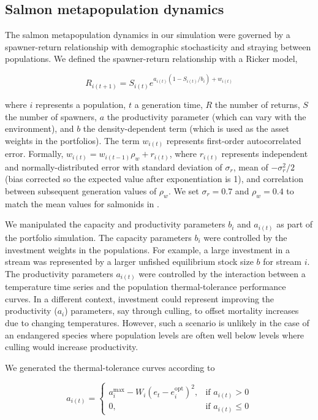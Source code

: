 \documentclass[12pt,english]{article}
\begin{document}
\begin{spacing}{1.3}
\subsection{Salmon metapopulation dynamics}\label{salmon-metapopulation-dynamics}

The salmon metapopulation dynamics in our simulation were governed by a spawner-return relationship with demographic stochasticity and straying between populations. We defined the spawner-return relationship with a Ricker model,

\[R_{i(t+1)} = S_{i(t)}e^{a_{i(t)}(1-S_{i(t)}/b_i) + w_{i(t)}}\]

\noindent
where $i$ represents a population, $t$ a generation time, $R$ the number of returns, $S$ the number of spawners, $a$ the productivity parameter (which can vary with the environment), and $b$ the density-dependent term (which is used as the asset weights in the portfolios). The term $w_{i(t)}$ represents first-order autocorrelated error. Formally, $w_{i(t)} = w_{i(t-1)} \rho_w + r_{i(t)}$, where $r_{i(t)}$ represents independent and normally-distributed error with standard deviation of $\sigma_r$, mean of $-\sigma_r^2 / 2$ (bias corrected so the expected value after exponentiation is 1), and correlation between subsequent generation values of $\rho_w$. We set $\sigma_r = 0.7$ and $\rho_w = 0.4$ to match the mean values for salmonids in \citet{thorson2014a}.

We manipulated the capacity and productivity parameters $b_i$ and $a_{i(t)}$ as part of the portfolio simulation. The capacity parameters $b_i$ were controlled by the investment weights in the populations. For example, a large investment in a stream was represented by a larger unfished equilibrium stock size $b$ for stream $i$. The productivity parameters $a_{i(t)}$ were controlled by the interaction between a temperature time series and the population thermal-tolerance performance curves. In a different context, investment could represent improving the productivity ($a_i$) parameters, say through culling, to offset mortality increases due to changing temperatures. However, such a scenario is unlikely in the case of an endangered species where population levels are often well below levels where culling would increase productivity.

We generated the thermal-tolerance curves according to

\[a_{i(t)} = \begin{cases} a_i^{\mathrm{max}} -
W_i (e_t - e_i^{\mathrm{opt}})^2,
& \text{if } a_{i(t)} > 0\\ 0, & \text{if } a_{i(t)} \leq
0 \end{cases}\]


\end{spacing}
\end{document}
